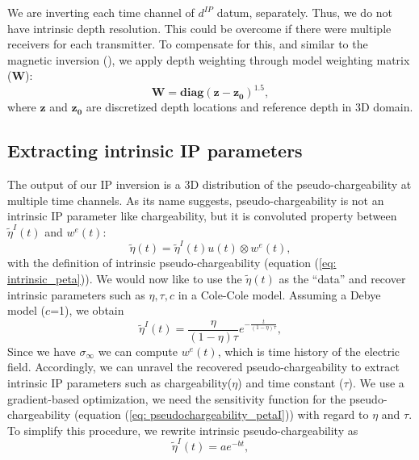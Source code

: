 \documentclass[a4paper, 11pt]{article}
\newcommand{\siginf}{\sigma_\infty}
\newcommand{\peta}{\tilde{\eta}}
\newcommand{\dip}{d^{IP}}
\begin{document}
We are inverting each time channel of $\dip$ datum, separately. Thus, we do not have intrinsic depth resolution. This could be overcome if there were multiple receivers for each transmitter. To compensate for this, and similar to the magnetic inversion (\cite{LiMag3D}), we apply depth weighting through model weighting matrix ($\mathbf{W}$):
\begin{equation}
    \mathbf{W} = \mathbf{diag}(\mathbf{z-z_0})^{1.5},
    \label{eq: weight_mat}
\end{equation}
where $\mathbf{z}$ and $\mathbf{z_0}$ are discretized depth locations and reference depth in 3D domain.

\subsection{Extracting intrinsic IP parameters}
\label{section: extract_intrinsicIP}
The output of our IP inversion is a 3D distribution of the pseudo-chargeability at multiple time channels. 
As its name suggests, pseudo-chargeability is not an intrinsic IP parameter like chargeability, but it is convoluted property between $\peta^{I}(t)$ and $w^{e}(t)$:
\begin{equation}
  \peta(t) = \peta^{I}(t)u(t) \otimes w^e(t),
  \label{eq: pseudochargeability_petaI}
\end{equation}
with the definition of intrinsic pseudo-chargeability (equation (\ref{eq: intrinsic_peta})).
We would now like to use the $\peta(t)$ as the “data” and recover intrinsic parameters such as $\eta, \tau, c$ in a Cole-Cole model. Assuming a Debye model ($c$=1), we obtain
\begin{equation}
    \peta^{I}(t) = \frac{\eta}{(1-\eta)\tau}e^{-\frac{t}{(1-\eta)\tau}},
    \label{eq: intrinsic_peta_debye}
\end{equation}
Since we have $\siginf$ we can compute $w^e(t)$, which is time history of the electric field. 
Accordingly, we can unravel the recovered pseudo-chargeability to extract intrinsic IP parameters such as chargeability($\eta$) and time constant ($\tau$). 
We use a gradient-based optimization, we need the sensitivity function for the pseudo-chargeability (equation (\ref{eq: pseudochargeability_petaI})) with regard to $\eta$ and $\tau$. 
To simplify this procedure, we rewrite intrinsic pseudo-chargeability as 
\begin{equation}
  \peta^{I}(t) = a e^{-bt},
\end{equation}
\end{document}
